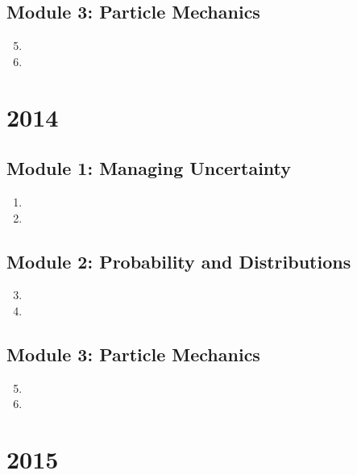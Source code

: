 \documentclass[fleqn,titlepage]{book}
\numberwithin{equation}{section}
\theoremstyle{plain}
\theoremstyle{definition}
\theoremstyle{remark}
\begin{document}
\section{Module 3: Particle Mechanics}
\begin{enumerate}[label=\bfseries  \arabic*.]\setcounter{enumi}{4}
\item 
\item 
\end{enumerate}

\chapter{2014}
\section{Module 1: Managing Uncertainty}
\begin{enumerate}[label=\bfseries  \arabic*.]\setcounter{enumi}{0}
\item 
\item 
\end{enumerate}
\section{Module 2: Probability and Distributions}
\begin{enumerate}[label=\bfseries  \arabic*.]\setcounter{enumi}{2}
\item 
\item 
\end{enumerate}
\section{Module 3: Particle Mechanics}
\begin{enumerate}[label=\bfseries  \arabic*.]\setcounter{enumi}{4}
\item 
\item 
\end{enumerate}

\chapter{2015}
\end{document}
